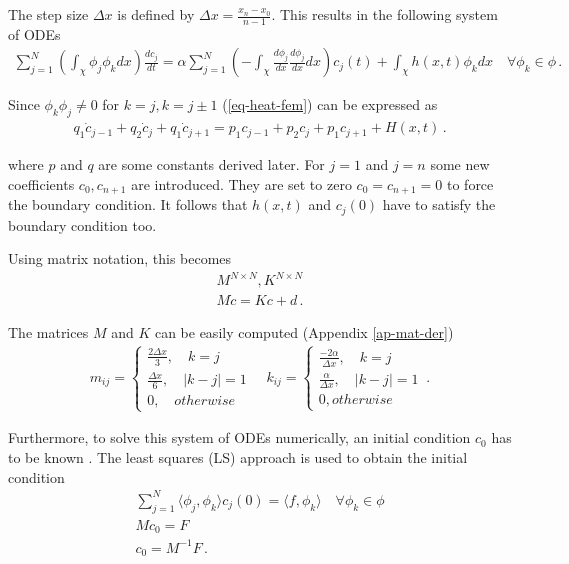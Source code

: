 The step size \(\Delta x\) is defined by \(\Delta x = \frac{x_n - x_0}{n-1}\). \label{def-delta-x}
This results in the following system of ODEs
\begin{gather}
\sum_{j=1}^N\left(\int_{\chi} \phi_{j}\phi_{k}dx\right)\frac{dc_{j}}{dt} = \alpha \sum_{j = 1}^N\left(-\int_{\chi} \frac{d\phi_{j}}{dx}\frac{d\phi_{j}}{dx}dx\right)c_{j}(t) + \int_{\chi}h(x, t) \phi_{k} dx
\quad \forall \phi_{k} \in \phi \,. \label{eq-heat-fem}
\end{gather}

Since \(\phi_k \phi_j \neq 0\) for \(k = j, k = j \pm 1\) (\ref{eq-heat-fem}) 
can be expressed as 
\begin{gather}
q_1\dot{c}_{j-1} + q_2 \dot{c}_{j} + q_1 \dot{c}_{j+1} = p_1 c_{j-1} + p_2 c_{j} + p_1 c_{j+1} + H(x,t) \,.
\end{gather}

where \(p\) and \(q\) are some constants derived later.
For \(j=1\)  and \(j=n\) some new coefficients \(c_0, c_{n+1}\) are introduced.
They are set to zero \(c_0 = c_{n+1} = 0\) to force the boundary condition.
It follows that \(h(x, t)\) and \(c_j(0)\) have to satisfy the boundary condition too.

Using matrix notation, this becomes
\begin{gather}
M^{N \times N}, K^{N \times N} \\
M\dot{c} = Kc + d \,. \label{eq-heat-almost-ss}
\end{gather}

The matrices \(M\) and \(K\) can be easily computed (Appendix \ref{ap-mat-der})
\begin{gather}
m_{ij} = \begin{cases}
\frac{2\Delta x}{3}, \quad k = j \\
\frac{\Delta x}{6}, \quad |k - j| = 1 \\
0, \quad otherwise 
\end{cases} \label{def-mat-a}
\quad
k_{ij} = \begin{cases}
\frac{-2\alpha}{\Delta x}, \quad k = j \\
\frac{\alpha}{\Delta x}, \quad |k - j| = 1 \\
0, otherwise
\end{cases}\,.
\end{gather}

Furthermore, to solve this system of ODEs numerically, an initial condition \(c_{0}\) has to be known \cite{Gustafsson2011b}.
The least squares (LS) approach is used to obtain the initial condition \cite{Gustafsson2011c}
\begin{gather}
\sum_{j = 1}^N \langle \phi_j, \phi_k \rangle c_{j}(0) = \langle f, \phi_{k} \rangle \quad \forall \phi_k \in \phi \\
Mc_{0} = F \label{F}\\ 
c_{0} = M^{-1}F \,. \label{c0}
\end{gather}

